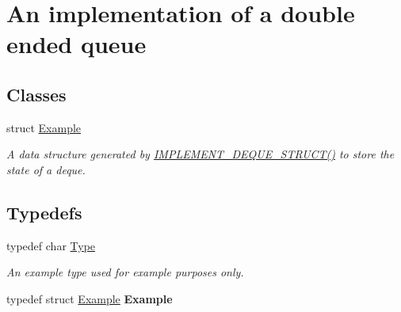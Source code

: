 \hypertarget{group__DEQUE}{}\section{An implementation of a double ended queue}
\label{group__DEQUE}
\subsection*{Classes}
\begin{DoxyCompactItemize}
\item 
struct \hyperlink{structExample}{Example}
\begin{DoxyCompactList}\small\item\em A data structure generated by \hyperlink{deque_8h_a091cfc1289538b13036bcd36d12a3c01}{I\+M\+P\+L\+E\+M\+E\+N\+T\+\_\+\+D\+E\+Q\+U\+E\+\_\+\+S\+T\+R\+U\+C\+T()} to store the state of a deque. \end{DoxyCompactList}\end{DoxyCompactItemize}
\subsection*{Typedefs}
\begin{DoxyCompactItemize}
\item 
\mbox{\label{group__DEQUE_gac9c83c2070eb6b5891cf742b90f54c68}} 
typedef char \hyperlink{group__DEQUE_gac9c83c2070eb6b5891cf742b90f54c68}{Type}
\begin{DoxyCompactList}\small\item\em An example type used for example purposes only. \end{DoxyCompactList}\item 
\mbox{\label{group__DEQUE_gaa626b5ffb77cbc32a218d12ff99f3907}} 
typedef struct \hyperlink{structExample}{Example} {\bfseries Example}
\end{DoxyCompactItemize}
